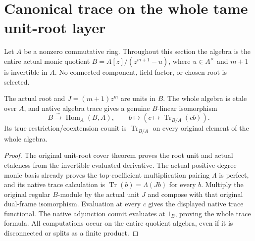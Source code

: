 \section{Canonical trace on the whole tame unit-root layer}
\label{sec:kn-nadel-canonical-unit-root}

Let $A$ be a nonzero commutative ring.  Throughout this section the algebra is the entire actual monic quotient
$B=A[z]/(z^{m+1}-u)$, where $u\in A^\times$ and $m+1$ is invertible
in $A$.  No connected component, field factor, or chosen root is selected.

\begin{theorem}
\label{thm:kn-nadel-canonical-unit-root-trace-dual}
\leanok
{}
The actual root and $J=(m+1)z^m$ are units in $B$.  The whole algebra
is etale over $A$, and native algebra trace gives a genuine $B$-linear
isomorphism
\[
 B\xrightarrow{\sim}\operatorname{Hom}_A(B,A),\qquad
 b\longmapsto(c\longmapsto\operatorname{Tr}_{B/A}(cb)).
\]
Its true restriction/coextension counit is $\operatorname{Tr}_{B/A}$
on every original element of the whole algebra.
\end{theorem}
\begin{proof}
The original unit-root cover theorem proves the root unit and actual
etaleness from the invertible evaluated derivative.  The actual
positive-degree monic basis already proves the top-coefficient
multiplication pairing $\Lambda$ is perfect, and its native trace
calculation is $\operatorname{Tr}(b)=\Lambda(Jb)$ for every $b$.
Multiply the original regular $B$-module by the actual unit $J$ and
compose with that original dual-frame isomorphism.  Evaluation at
every $c$ gives the displayed native trace functional.  The native
adjunction counit evaluates at $1_B$, proving the whole trace formula.
All computations occur on the entire quotient algebra, even if it is
disconnected or splits as a finite product.
\end{proof}

